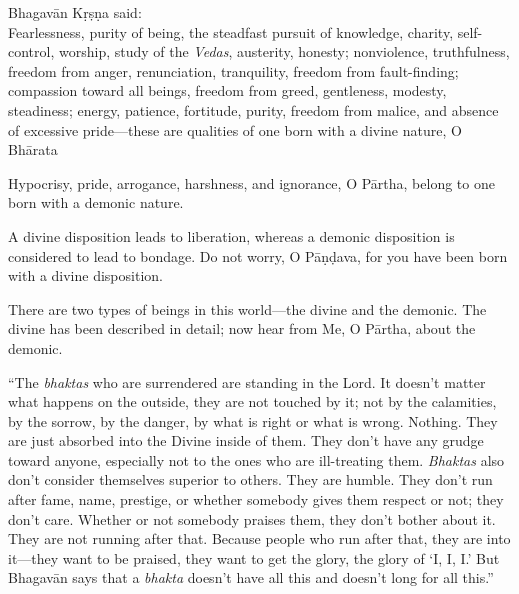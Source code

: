 {\hspace*{1em}Bhagavān Kṛṣṇa said: \\
Fearlessness, purity of being, the steadfast pursuit of knowledge, charity, self-control, worship, study of the \textit{Vedas}, austerity, honesty; nonviolence, truthfulness, freedom from anger, renunciation, tranquility, freedom from fault-finding; compassion toward all beings, freedom from greed, gentleness, modesty, steadiness; energy, patience, fortitude, purity, freedom from malice, and absence of excessive pride---these are qualities of one born with a divine nature, O Bhārata}

{Hypocrisy, pride, arrogance, harshness, and ignorance, O Pārtha, belong to one born with a demonic nature.}

{A divine disposition leads to liberation, whereas a demonic disposition is considered to lead to bondage. Do not worry, O Pāṇḍava, for you have been born with a divine disposition.}

{There are two types of beings in this world---the divine and the demonic. The divine has been described in detail; now hear from Me, O Pārtha, about the demonic.}

\enquote{The \textit{bhaktas} who are surrendered are standing in the Lord. It doesn’t matter what happens on the outside, they are not touched by it; not by the calamities, by the sorrow, by the danger, by what is right or what is wrong. Nothing. They are just absorbed into the Divine inside of them. They don’t have any grudge toward anyone, especially not to the ones who are ill-treating them. \textit{Bhaktas} also don’t consider themselves superior to others. They are humble. They don’t run after fame, name, prestige, or whether somebody gives them respect or not; they don’t care. Whether or not somebody praises them, they don’t bother about it. They are not running after that. Because people who run after that, they are into it---they want to be praised, they want to get the glory, the glory of \enquote{I, I, I.} But Bhagavān says that a \textit{bhakta} doesn’t have all this and doesn’t long for all this.}

